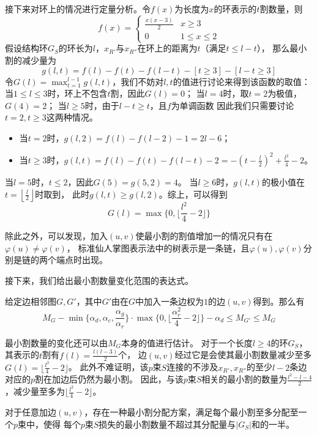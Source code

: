 接下来对环上的情况进行定量分析。令$f(x)$为长度为$x$的环表示的$t$割数量，则
\begin{equation*}
  f(x)=\begin{cases}
    \frac{x(x-3)}2&x\geq 3\\0&1\leq x\leq 2\end{cases}  
\end{equation*}
假设结构环$G_S$的环长为$l$，$x_{R'}$与$x_{R''}$在环上的距离为$t$（满足$t\leq l-t$），
那么最小割的减少量为
\begin{equation*}
  g(l,t)=f(l)-f(t)-f(l-t)-[t\geq 3]-[l-t\geq 3]
\end{equation*}
令$G(l)=\max_{t=1}^{l-1}g(l,t)$，我们不妨对$l,t$的值进行讨论来得到该函数的取值：
当$1\leq l\leq 3$时，环上不包含$t$割，因此$G(l)=0$；
当$l=4$时，取$t=2$为极值，$G(4)=2$；
当$l\geq 5$时，由于$l-t\geq t$，且$f$为单调函数
因此我们只需要讨论$t=2,t\geq 3$这两种情况。
\begin{itemize}
  \item 当$t=2$时，$g(l,2)=f(l)-f(l-2)-1=2l-6$；
  \item 当$t\geq 3$时，$g(l,t)=f(l)-f(t)-f(l-t)-2=-(t-\frac l2)^2+\frac{l^2}4-2$。
\end{itemize}
当$l=5$时，$t\leq 2$，因此$G(5)=g(5,2)=4$。
当$l\geq 6$时，$g(l,t)$的极小值在$t=\left\lfloor\frac l2\right\rfloor$时取到，
此时$g(l,t)\geq g(l,2)$。综上，可以得到
\begin{equation*}
  G(l)=\max{\{0,\lfloor\frac{l^2}4-2\rfloor\}}
\end{equation*}

除此之外，可以发现，加入$(u,v)$使最小割的割值增加一的情况只有在$\varphi(u)\neq\varphi(v)$，
标准仙人掌图表示法中的树表示是一条链，且$\varphi(u),\varphi(v)$分别是链的两个端点时出现。

接下来，我们给出最小割数量变化范围的表达式。

\begin{theorem}
    给定边相邻图$G,G'$，其中$G'$由在$G$中加入一条边权为$1$的边$(u,v)$得到。那么有
    \begin{equation*}
      M_G-\min{\{\alpha_d,\alpha_c,\frac{\alpha_g}{\alpha_r}\}}·\max{\{0,\lfloor\frac{\alpha_r^2}4-2\rfloor\}}-\alpha_d \leq M_{G'}\leq M_G
    \end{equation*}

\end{theorem}

最小割数量的变化还可以由$M_G$本身的值进行估计。
对于一个长度$l\geq 4$的环$G_S$，其表示的$t$割有$f(l)=\frac{l(l-3)}2$个，
边$(u,v)$经过它是会使其最小割数量减少至多$G(l)= \lfloor\frac{l^2}4-2\rfloor$。
此外不难证明，该$p$束$S$连接的不涉及$x_{R'},x_{R''}$的至少$l-2$条边对应的$p$割在加边后仍然为最小割。
因此，与该$p$束$S$相关的最小割的数量为$\frac{l^2-l-4}2$，减少量至多为$\lfloor\frac{l^2}4-2\rfloor$。
\begin{theorem}
  对于任意加边$(u,v)$，存在一种最小割分配方案，满足每个最小割至多分配至一个$p$束中，使得
  每个$p$束$S$损失的最小割数量不超过其分配量与$|G_S|$和的一半。
\end{theorem}

